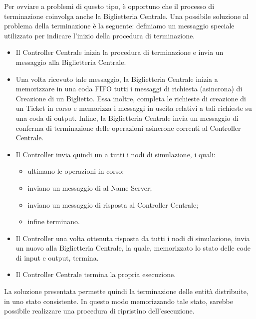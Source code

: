 	Per ovviare a problemi di questo tipo, è opportuno che il processo di terminazione coinvolga anche la Biglietteria Centrale. Una possibile soluzione al problema della terminazione è la seguente: definiamo  un messaggio speciale utilizzato per indicare l'inizio della procedura di terminazione. 
	\begin{itemize}
		\item Il Controller Centrale inizia la procedura di terminazione e invia un messaggio  alla Biglietteria Centrale.
		\item Una volta ricevuto tale messaggio, la Biglietteria Centrale inizia a memorizzare in una coda FIFO tutti i messaggi di richiesta (asincrona) di Creazione di un Biglietto. Essa inoltre, completa le richieste di creazione di un Ticket in corso e memorizza i messaggi in uscita relativi a tali richieste su una coda di output.
		Infine, la Biglietteria Centrale invia un messaggio di conferma di terminazione delle operazioni asincrone correnti al Controller Centrale.
		\item Il Controller invia quindi un  a tutti i nodi di simulazione, i quali:
			\begin{itemize}
				\item ultimano le operazioni in corso;
				\item inviano un messaggio di  al Name Server;
				\item inviano un messaggio di risposta al Controller Centrale;
				\item infine terminano.
			\end{itemize}
		\item Il Controller una volta ottenuta risposta da tutti i nodi di simulazione, invia un nuovo  alla Biglietteria Centrale, la quale, memorizzato lo stato delle code di input e output, termina.
		\item Il Controller Centrale termina la propria esecuzione.
	\end{itemize}
	
	La soluzione presentata permette quindi la terminazione delle entità distribuite, in uno stato consistente. In questo modo memorizzando tale stato, sarebbe possibile realizzare una procedura di ripristino dell'esecuzione. 
